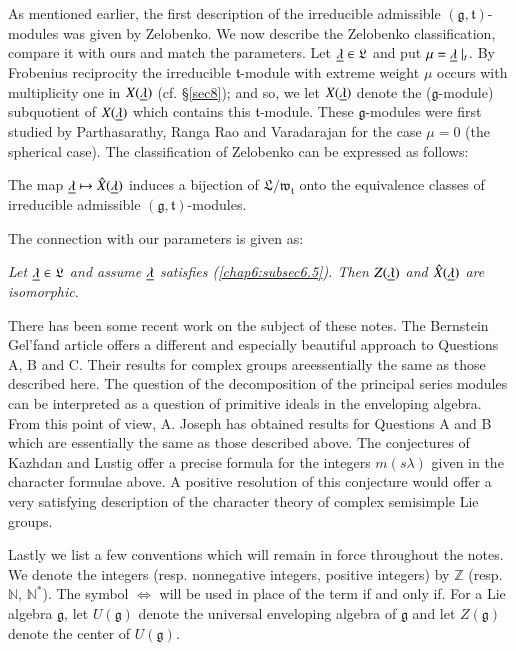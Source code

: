 As mentioned earlier, the first description of the irreducible
admissible $(\mathfrak{g}, \mathfrak{t})$-modules was given by
Zelobenko. We now describe the Zelobenko classification, compare it
with ours and match the parameters. Let $\underline{\lambda} \in \mathfrak{L}$
and put $\mu = \underline{\lambda}\mid_t$. By Frobenius reciprocity the
irreducible $\mathfrak{t}$-module with extreme weight $\mu$ occurs
with multiplicity one in $X(\underline{\lambda})$ (cf. \S \ref{sec8}); and so, we let
$X(\underline{\lambda})$ denote the ($\mathfrak{g}$-module) subquotient of
$X(\underline{\lambda})$ which contains this $\mathfrak{t}$-module. These
$\mathfrak{g}$-modules were first studied by Parthasarathy, Ranga Rao
and Varadarajan \cite{key30} for the case $\mu = 0$ (the spherical
case). The classification of Zelobenko \cite{key36} can be expressed
as follows:

\begin{theorem*}
The map $\underline{\lambda} \mapsto \hat{X}(\underline{\lambda})$ induces a bijection
of $\mathfrak{L}/\mathfrak{w}_\mathfrak{t}$ onto the equivalence
classes of irreducible admissible $(\mathfrak{g},
\mathfrak{t})$-modules.
\end{theorem*}

The connection with our parameters is given as:

\medskip
{}
\textit{Let $\underline{\lambda} \in \mathfrak{L}$ and assume $\underline{\lambda}$
  satisfies (\ref{chap6:subsec6.5}). Then $Z(\underline{\lambda})$ and
  $\hat{X} (\underline{\lambda})$ are isomorphic}.

There has been some recent work on the subject of these notes. The
Bernstein Gel'fand article \cite{key3} offers a different and
especially beautiful approach to Questions A, B and C. Their results
for complex groups are\pageoriginale essentially the same as those
described here. The question of the decomposition of the principal
series modules can be interpreted as a question of primitive ideals in
the enveloping algebra. From this point of view, A. Joseph
\cite{key25} has obtained results for Questions A and B which are
essentially the same as those described above. The conjectures of
Kazhdan and Lustig \cite{key26} offer a precise formula for the
integers $m(s\lambda)$ given in the character formulae above. A
positive resolution of this conjecture would offer a very satisfying
description of the character theory of complex semisimple Lie groups. 

Lastly we list a few conventions which will remain in force throughout
the notes. We denote the integers (resp. nonnegative integers,
positive integers) by $\mathbb{Z}$ (resp. $\mathbb{N}$,
$\mathbb{N}^*$). The symbol $\Leftrightarrow$ will be used in place of
the term if and only if. For a Lie algebra $\mathfrak{g}$, let
$U(\mathfrak{g})$ denote the universal enveloping algebra of
$\mathfrak{g}$ and let $Z(\mathfrak{g})$ denote the center of
$U(\mathfrak{g})$. 
